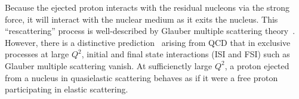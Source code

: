 Because the ejected proton interacts with the residual nucleons via the strong
force, it will interact with the nuclear medium as it exits the nucleus.
This ``rescattering'' process is well-described by Glauber multiple scattering
theory~\cite{Glauber_1959}.
However, there is a distinctive prediction~\cite{Mueller_1982,Brodsky_1982}
arising from QCD that in exclusive processes at large $Q^2$, initial and final
state interactions (ISI and FSI) such as Glauber multiple scattering vanish.
At sufficienctly large $Q^2$, a proton ejected from a nucleus in quasielastic
scattering behaves as if it were a free proton participating in elastic
scattering.
